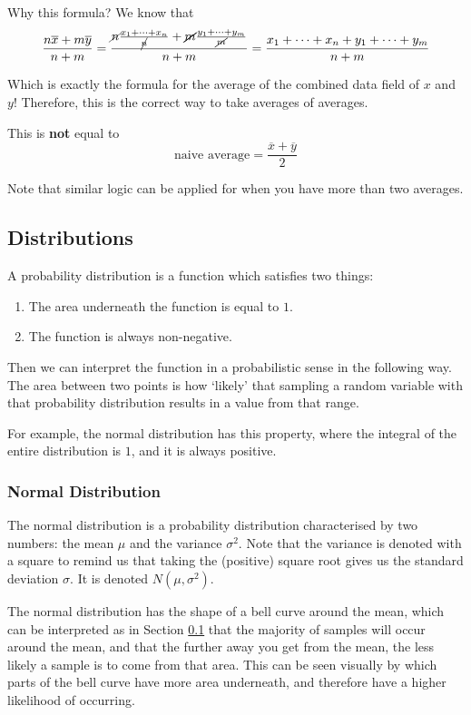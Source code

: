 Why this formula? We know that 
\[ \frac{n\overline{x}+m\overline{y}}{n+m} =  \frac{\cancel{n}\frac{x_1 + \dots + x_n}{\cancel{n}}+\cancel{m}\frac{y_1 + \dots + y_m}{\cancel{m}}}{n+m} = \frac{x_1 + \dots + x_n + y_1 + \dots + y_m}{n+m} \]

Which is exactly the formula for the average of the combined data field of $x$ and $y$! Therefore, this is the correct way to take averages of averages. 

This is \textbf{not} equal to 
\[\text{naive average} = \frac{\overline{x}+ \overline{y}}{2}\]

Note that similar logic can be applied for when you have more than two averages.
\subsection{Distributions} \label{sec:distributions}
A probability distribution is a function which satisfies two things:
\begin{enumerate}
    \item The area underneath the function is equal to $1$.
    \item The function is always non-negative.
\end{enumerate}

Then we can interpret the function in a probabilistic sense in the following way. The area between two points is how `likely' that sampling a random variable with that probability distribution results in a value from that range.

For example, the normal distribution has this property, where the integral of the entire distribution is $1$, and it is always positive.

\subsubsection{Normal Distribution} \label{sec:normal-distribution}

The normal distribution is a probability distribution characterised by two numbers: the mean $\mu$ and the variance $\sigma^2$. 
Note that the variance is denoted with a square to remind us that taking the (positive) square root gives us the standard deviation $\sigma$.
It is denoted $N(\mu,\sigma^2)$.

The normal distribution has the shape of a bell curve around the mean, which can be interpreted as in 
Section \ref{sec:distributions} that the majority of samples will occur around the mean, and that the further away you get from 
the mean, the less likely a sample is to come from that area. This can be seen visually by which parts of the bell curve have more area underneath, and therefore have a higher likelihood of occurring.

